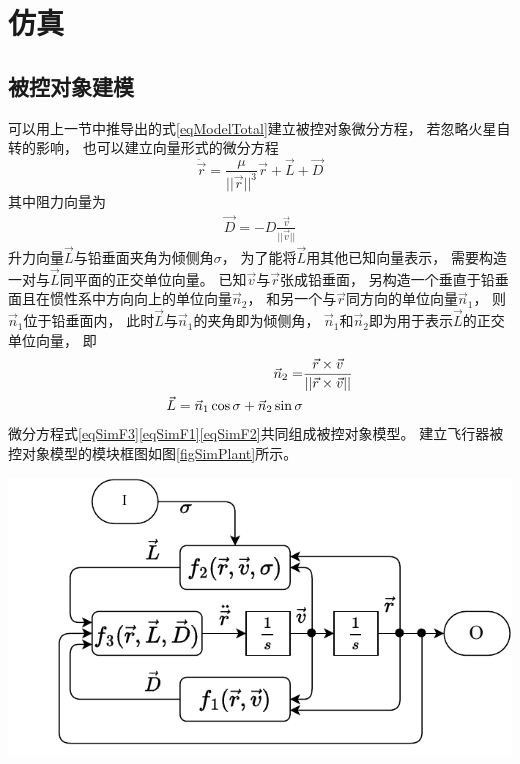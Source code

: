 \section{仿真}

\subsection{被控对象建模}
可以用上一节中推导出的式\eqref{eqModelTotal}建立被控对象微分方程，
若忽略火星自转的影响，
也可以建立向量形式的微分方程
\begin{equation}
    \ddot{\vec{r}} = \frac{\mu}{||\vec{r}||^3}\vec{r}+\vec{L}+\vec{D} \label{eqSimF3}
\end{equation}
其中阻力向量为
\begin{align}
    \vec{D} = -D\frac{\vec{v}}{||\vec{v}||} \label{eqSimF1}
\end{align}
升力向量$\vec{L}$与铅垂面夹角为倾侧角$\sigma$，
为了能将$\vec{L}$用其他已知向量表示，
需要构造一对与$\vec{L}$同平面的正交单位向量。
已知$\vec{v}$与$\vec{r}$张成铅垂面，
另构造一个垂直于铅垂面且在惯性系中方向向上的单位向量$\vec{n}_2$，
和另一个与$\vec{r}$同方向的单位向量$\vec{n}_1$，
则$\vec{n}_1$位于铅垂面内，
此时$\vec{L}$与$\vec{n}_1$的夹角即为倾侧角，
$\vec{n}_1$和$\vec{n}_2$即为用于表示$\vec{L}$的正交单位向量，
即
\begin{align}
    \vec{n}_2 =& \frac{\vec{r}\times\vec{v}}{||\vec{r}\times\vec{v}||} \notag\\
    \vec{L}=\vec{n}_1\cos\sigma + \vec{n}_2\sin\sigma \label{eqSimF2}
\end{align}
微分方程式\eqref{eqSimF3}\eqref{eqSimF1}\eqref{eqSimF2}共同组成被控对象模型。
建立飞行器被控对象模型的模块框图如图\ref{figSimPlant}所示。
\begin{center}
	\includegraphics[scale=0.8]{plant.pdf}  \\
	\label{figSimPlant}
\end{center}
